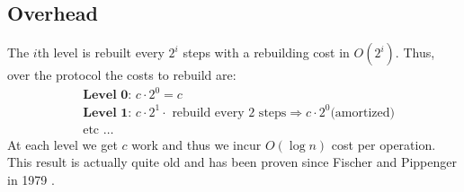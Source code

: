 \documentclass[11pt]{article}
\begin{document}
{\subsection{Overhead}
The $i$th level is rebuilt every $2^i$ steps with a rebuilding cost in $O(2^i)$. Thus, over the protocol the costs to rebuild are:
\begin{align*}
    &\textbf{Level 0: } c \cdot 2^0 = c \\
    &\textbf{Level 1: } c \cdot 2^1\cdot \text{ rebuild every 2 steps} \Rightarrow c \cdot 2^0 \text{(amortized)} \tag{Rebuild cost is linear}\\
    &\text{etc } \dots
\end{align*}
At each level we get $c$ work and thus we incur $O(\log n)$ cost per operation. This result is actually quite old and has been proven since Fischer and Pippenger in 1979 \cite{pippenger1979relations}.

\newpage
}


\end{document}
